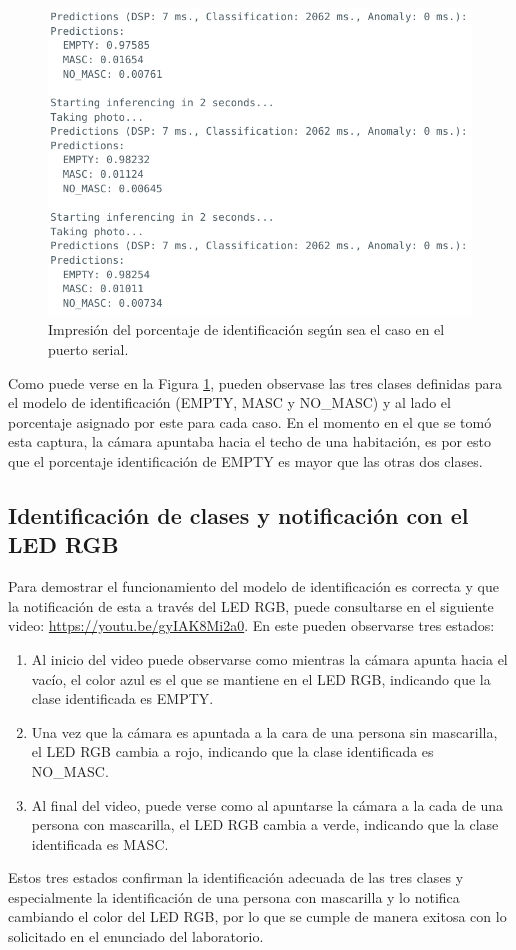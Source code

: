 \begin{figure}[H]
\centering
\includegraphics[width=130mm]{./Figuras/Desarrollo_Analisis/SM}
\caption{Impresión del porcentaje de identificación según sea el caso en el puerto serial.} 
\label{fig:SM}
\end{figure}

Como puede verse en la Figura \ref{fig:SM}, pueden observase las tres clases definidas para el modelo de identificación (EMPTY, MASC y NO\_MASC) y al lado el porcentaje asignado por este para cada caso. En el momento en el que se tomó esta captura, la cámara apuntaba hacia el techo de una habitación, es por esto que el porcentaje identificación de EMPTY es mayor que las otras dos clases.

\subsection{Identificación de clases y notificación con el LED RGB}
Para demostrar el funcionamiento del modelo de identificación es correcta y que la notificación de esta a través del LED RGB, puede consultarse en el siguiente video: \url{https://youtu.be/gyIAK8Mi2a0}. En este pueden observarse tres estados: 

\begin{enumerate}
    \item Al inicio del video puede observarse como mientras la cámara apunta hacia el vacío, el color azul es el que se mantiene en el LED RGB, indicando que la clase identificada es EMPTY. 
    
    \item Una vez que la cámara es apuntada a la cara de una persona sin mascarilla, el LED RGB cambia a rojo, indicando que la clase identificada es NO\_MASC.
    
    \item Al final del video, puede verse como al apuntarse la cámara a la cada de una persona con mascarilla, el LED RGB cambia a verde, indicando que la clase identificada es MASC.
\end{enumerate}

Estos tres estados confirman la identificación adecuada de las tres clases y especialmente la identificación de una persona con mascarilla y lo notifica cambiando el color del LED RGB, por lo que se cumple de manera exitosa con lo solicitado en el enunciado del laboratorio.  